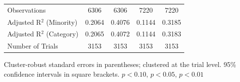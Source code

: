 \begin{table}[!htbp]
{\begin{tabular}{l*{4}{c}}
\midrule
Observations      &6306&6306&7220&7220\\
Adjusted R$^2$ (Minority)      &0.2064&0.4076&0.1144&0.3185\\
Adjusted R$^2$ (Category)      &0.2065&0.4072&0.1144&0.3183\\
Number of Trials      &3153&3153&3153&3153\\
\bottomrule
\end{tabular}
}
\begin{minipage}{\textwidth}
\footnotesize
Cluster-robust standard errors in parentheses; clustered at the trial level. 95\% confidence intervals in square brackets.
\sym{*} \(p<0.10\), \sym{**} \(p<0.05\), \sym{***} \(p<0.01\)
\end{minipage}
\end{table}

